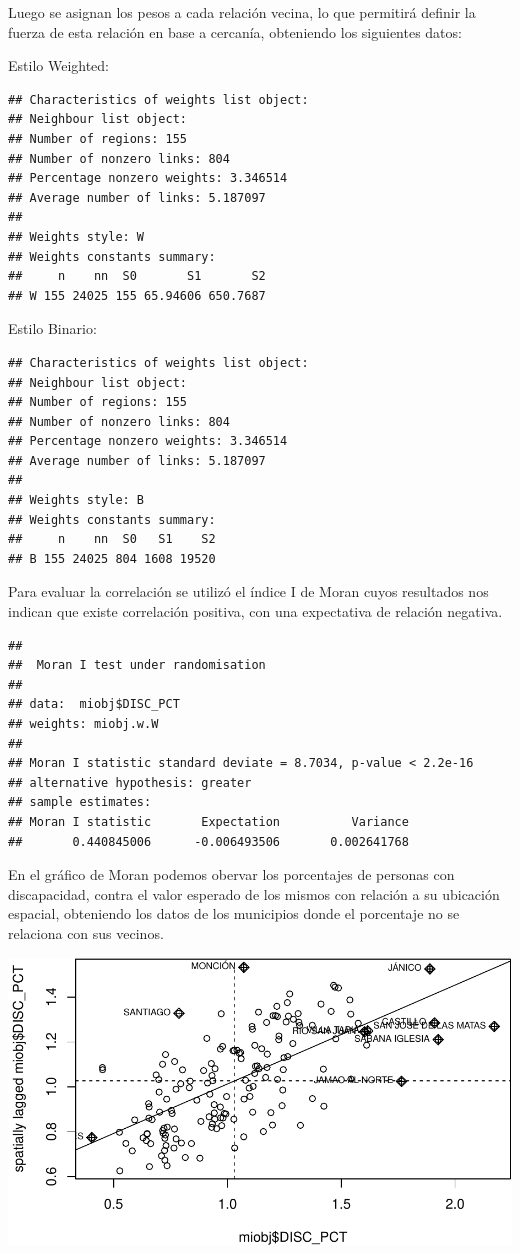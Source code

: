 \documentclass[11pt,]{article}
\begin{document}
Luego se asignan los pesos a cada relación vecina, lo que permitirá
definir la fuerza de esta relación en base a cercanía, obteniendo los
siguientes datos:

Estilo Weighted:

\begin{verbatim}
## Characteristics of weights list object:
## Neighbour list object:
## Number of regions: 155 
## Number of nonzero links: 804 
## Percentage nonzero weights: 3.346514 
## Average number of links: 5.187097 
## 
## Weights style: W 
## Weights constants summary:
##     n    nn  S0       S1       S2
## W 155 24025 155 65.94606 650.7687
\end{verbatim}

Estilo Binario:

\begin{verbatim}
## Characteristics of weights list object:
## Neighbour list object:
## Number of regions: 155 
## Number of nonzero links: 804 
## Percentage nonzero weights: 3.346514 
## Average number of links: 5.187097 
## 
## Weights style: B 
## Weights constants summary:
##     n    nn  S0   S1    S2
## B 155 24025 804 1608 19520
\end{verbatim}

Para evaluar la correlación se utilizó el índice I de Moran cuyos
resultados nos indican que existe correlación positiva, con una
expectativa de relación negativa.

\begin{verbatim}
## 
##  Moran I test under randomisation
## 
## data:  miobj$DISC_PCT  
## weights: miobj.w.W    
## 
## Moran I statistic standard deviate = 8.7034, p-value < 2.2e-16
## alternative hypothesis: greater
## sample estimates:
## Moran I statistic       Expectation          Variance 
##       0.440845006      -0.006493506       0.002641768
\end{verbatim}

En el gráfico de Moran podemos obervar los porcentajes de personas con
discapacidad, contra el valor esperado de los mismos con relación a su
ubicación espacial, obteniendo los datos de los municipios donde el
porcentaje no se relaciona con sus vecinos.

\includegraphics{proyecto_files/figure-latex/unnamed-chunk-7-1.pdf}
\end{document}
